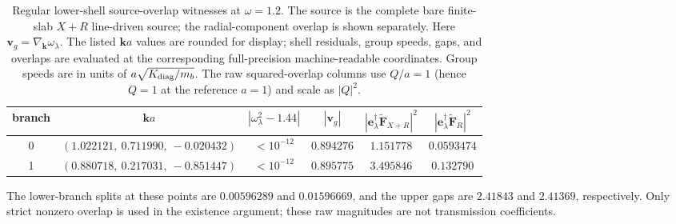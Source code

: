 \documentclass[10pt,aps,pre,onecolumn,notitlepage,nofootinbib]{revtex4-2}
\begin{document}
\begin{table}[htbp]
\caption{Regular lower-shell source-overlap witnesses at $\omega=1.2$. The source is the complete bare finite-slab $X+R$ line-driven source; the radial-component overlap is shown separately. Here $\bm v_g=\nabla_{\bm k}\omega_\lambda$. The listed $\bm k a$ values are rounded for display; shell residuals, group speeds, gaps, and overlaps are evaluated at the corresponding full-precision machine-readable coordinates. Group speeds are in units of $a\sqrt{K_{\rm diag}/m_b}$. The raw squared-overlap columns use $Q/a=1$ (hence $Q=1$ at the reference $a=1$) and scale as $|Q|^2$.}
\begin{ruledtabular}
\begin{tabular}{c c c c c c}
branch & $\bm k a$ & $|\omega_\lambda^2-1.44|$ & $|\bm v_g|$ & $|\bm e_\lambda^\dagger\widetilde{\bm F}_{X+R}|^2$ & $|\bm e_\lambda^\dagger\widetilde{\bm F}_{R}|^2$\\
\hline
0 & $(1.022121,\ 0.711990,\ -0.020432)$ & $<10^{-12}$ & $0.894276$ & $1.151778$ & $0.0593474$\\
1 & $(0.880718,\ 0.217031,\ -0.851447)$ & $<10^{-12}$ & $0.895775$ & $3.495846$ & $0.132790$\\
\end{tabular}
\end{ruledtabular}
\end{table}
The lower-branch splits at these points are $0.00596289$ and $0.01596669$, and the upper gaps are $2.41843$ and $2.41369$, respectively. Only strict nonzero overlap is used in the existence argument; these raw magnitudes are not transmission coefficients.
\end{document}
